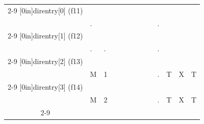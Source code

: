 \documentclass[11pt,a4paper]{article}
\begin{document}
\begin{center}

\begin{tabular}{ c   | m{0.45cm} | m{0.45cm} | m{0.45cm} | m{0.45cm} | m{0.45cm} | m{0.45cm} | m{0.45cm} | m{0.45cm} | c | m{0.45cm} | m{0.45cm} | m{0.45cm} | }
\cline{2-9} \cline{11-13}
\multirow[c]{2}{*}[0in]{direntry[0] (f11)}  &   & & & & & & & &     & & & \\
                                            & . & & & & & & & &  .  & & & \\
\cline{2-9} \cline{11-13}
\multirow[c]{2}{*}[0in]{direntry[1] (f12)}  &   &   & & & & & & &     & & & \\
                                            & . & . & & & & & & &  .  & & & \\
\cline{2-9} \cline{11-13}
\multirow[c]{2}{*}[0in]{direntry[2] (f13)}  &   &   & & & & & & &     & & & \\
                                            & M & 1 & & & & & & &  .  & T & X & T \\
\cline{2-9} \cline{11-13}
\multirow[c]{2}{*}[0in]{direntry[3] (f14)}  &   &   & & & & & & &     & & & \\
                                            & M & 2 & & & & & & &  .  & T & X & T \\
\cline{2-9} \cline{11-13}
\end{tabular}


\bigskip

\bigskip



\end{center}
\end{document}
